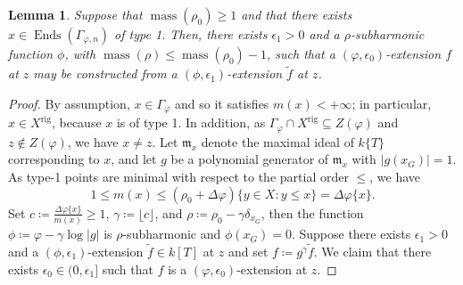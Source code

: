 \documentclass[10pt,reqno]{amsart}
\theoremstyle{plain}
\newtheorem{lemma}[theorem]{Lemma}
\theoremstyle{definition}
\newcommand{\frakm}{\mathfrak{m}}
\numberwithin{equation}{section}
\DeclareMathOperator{\Ends}{Ends}
\DeclareMathOperator{\mass}{mass}
\DeclareMathOperator{\rig}{rig}
\begin{document}
\begin{lemma}\label{lemma:two_variant}
Suppose that $\mass(\rho_0) \geq 1$ and that there exists $x \in \Ends(\Gamma_{\varphi,n})$ of type 1. Then, there exists $\epsilon_1 > 0$ and a $\rho$-subharmonic function $\phi$, with $\mass(\rho) \leq \mass(\rho_0) - 1$, such that a $(\varphi,\epsilon_0)$-extension $f$ at $z$ may be constructed from a $(\phi,\epsilon_1)$-extension $\tilde{f}$ at $z$.
\end{lemma}

\begin{proof}
By assumption, $x \in \Gamma_{\varphi}$ and so it satisfies $m(x) < +\infty$; in particular, $x \in X^{\rig}$, because $x$ is of type 1. 
In addition, as $\Gamma_{\varphi} \cap X^{\rig} \subseteq Z(\varphi)$ and $z \not\in Z(\varphi)$, we have $x \not= z$.
Let $\frakm_x$ denote the maximal ideal of $k\{ T \}$ corresponding to $x$, and let $g$ be a polynomial generator of $\frakm_x$ with $|g(x_G) | = 1$. As type-1 points are minimal with respect to the partial order $\leq$, we have
$$
1 \leq m(x) \leq (\rho_0 + \Delta \varphi) \{ y \in X \colon y \leq x \} = \Delta \varphi \{ x \}.
$$
Set $c \coloneqq \frac{\Delta\varphi\{ x \}}{m(x)} \geq 1$, $\gamma \coloneqq \lfloor c \rfloor$, and $\rho \coloneqq \rho_0 - \gamma\delta_{x_G}$, then the function $\phi \coloneqq \varphi - \gamma\log |g|$ is $\rho$-subharmonic and $\phi(x_G) = 0$. Suppose there exists $\epsilon_1 > 0$ and a $(\phi,\epsilon_1)$-extension $\tilde{f} \in k[T]$ at $z$ and set $f \coloneqq g^{\gamma} \tilde{f}$. We claim that there exists $\epsilon_0 \in (0,\epsilon_1]$ such that $f$ is a $(\varphi,\epsilon_0)$-extension at $z$. 


\end{proof}
\end{document}
